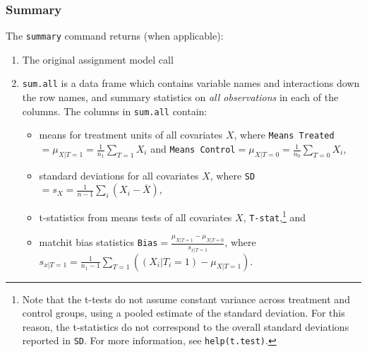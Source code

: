 \documentclass[oneside,letterpaper,titlepage]{article}
\begin{document}
\subsubsection{Summary}
The \texttt{summary} command returns (when applicable):
\begin{enumerate}
\item The original assignment model call 
\item \texttt{sum.all} is a data frame which contains variable names
  and interactions down the row names, and summary statistics on \emph{all
  observations} in each of the
  columns.  The columns in \texttt{sum.all} contain:
  \begin{itemize}
  \item means for treatment units of all covariates $X$, where \texttt{Means Treated}$= \mu_{X|T=1} =
    \frac{1}{n_1} \sum_{T=1} X_i$ and
    \texttt{Means Control}$= \mu_{X|T=0} = \frac{1}{n_0} \sum_{T=0} X_i$,
  \item standard deviations for all covariates $X$, where \texttt{SD}$= s_X = \frac{1}{n-1}
    \sum_{i} (X_i - \overline{X})$,
  \item t-statistics from means tests of all covariates $X$, \texttt{T-stat},\footnote{Note that the t-tests do
      not assume constant variance across treatment and control
      groups, using a pooled estimate of the standard deviation.  For
      this reason, the t-statistics do not correspond to the overall standard
      deviations reported in \texttt{SD}.
      For more information, see \texttt{help(t.test)}.} and
  \item matchit bias statistics \texttt{Bias}$=\frac{\mu_{X|T=1} -
      \mu_{X|T=0}}{s_{x|T=1}}$, where $s_{x|T=1} = \frac{1}{n_1-1}
    \sum_{T=1} ( (X_i|T_i=1) - \mu_{X|T=1})$.
  \end{itemize}


\end{enumerate}
\end{document}
